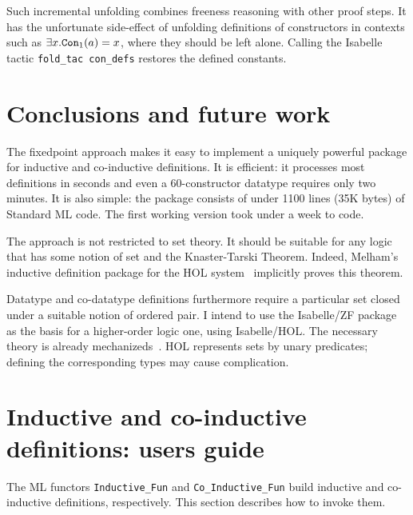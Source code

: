 Such incremental unfolding combines freeness reasoning with other proof
steps.  It has the unfortunate side-effect of unfolding definitions of
constructors in contexts such as $\exists x.{\tt Con}_1(a)=x$, where they should
be left alone.  Calling the Isabelle tactic {\tt fold\_tac con\_defs}
restores the defined constants.
\fi  %

\section{Conclusions and future work}
The fixedpoint approach makes it easy to implement a uniquely powerful
package for inductive and co-inductive definitions.  It is efficient: it
processes most definitions in seconds and even a 60-constructor datatype
requires only two minutes.  It is also simple: the package consists of
under 1100 lines (35K bytes) of Standard ML code.  The first working
version took under a week to code.

The approach is not restricted to set theory.  It should be suitable for
any logic that has some notion of set and the Knaster-Tarski Theorem.
Indeed, Melham's inductive definition package for the HOL
system~\cite{camilleri92} implicitly proves this theorem.

Datatype and co-datatype definitions furthermore require a particular set
closed under a suitable notion of ordered pair.  I intend to use the
Isabelle/ZF package as the basis for a higher-order logic one, using
Isabelle/HOL\@.  The necessary theory is already
mechanizeds~\cite{paulson-coind}.  HOL represents sets by unary predicates;
defining the corresponding types may cause complication.





\ifCADE{}
\else
\newpage
\appendix
\section{Inductive and co-inductive definitions: users guide}
The ML functors \verb|Inductive_Fun| and \verb|Co_Inductive_Fun| build
inductive and co-inductive definitions, respectively.  This section describes
how to invoke them.  

